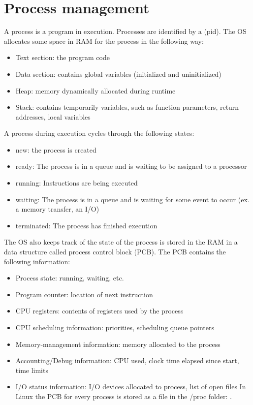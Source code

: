 \chapter{Process management}

A process is a program in execution. Processes are identified by a  (pid). The OS allocates some space in RAM for the process in the following way:

\begin{itemize}
  \item Text section: the program code
  \item Data section: contains global variables (initialized and uninitialized)
  \item Heap: memory dynamically allocated during runtime
  \item Stack: contains temporarily variables, such as function parameters, return addresses, local variables
\end{itemize}


A process during execution cycles through the following states:

\begin{itemize}
  \item new: the process is created
  \item ready: The process is in a queue and is waiting to be assigned to a processor
  \item running: Instructions are being executed
  \item waiting: The process is in a queue and is waiting for some event to occur (ex. a memory transfer, an I/O)
  \item terminated: The process has finished execution
\end{itemize}


The OS also keeps track of the state of the process is stored in the RAM in a data structure called process control block (PCB). The PCB contains the following information:

\begin{itemize}
  \item Process state: running, waiting, etc.
  \item Program counter: location of next instruction
  \item CPU registers: contents of registers used by the process
  \item CPU scheduling information: priorities, scheduling queue pointers
  \item Memory-management information: memory allocated to the process
  \item Accounting/Debug information: CPU used, clock time elapsed since start, time limits
  \item I/O status information: I/O devices allocated to process, list of open files
  In Linux the PCB for every process is stored as a file in the /proc folder: .
\end{itemize}

